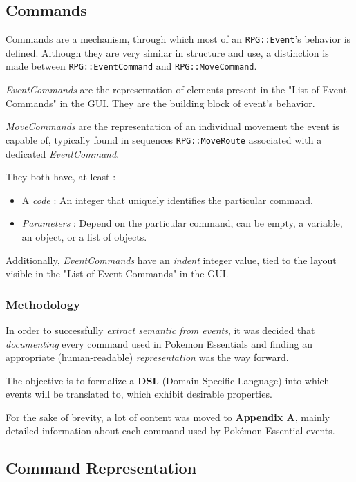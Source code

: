 \documentclass[11pt]{article}
\begin{document}
{\subsection{Commands}

Commands are a mechanism, through which most of an \verb|RPG::Event|'s behavior is defined. Although they are very similar in structure and use, a distinction is made between \verb|RPG::EventCommand| and \verb|RPG::MoveCommand|.

\textit{EventCommands} are the representation of elements present in the "List of Event Commands" in the GUI. They are the building block of event's behavior.

\textit{MoveCommands} are the representation of an individual movement the event is capable of, typically found in sequences \verb|RPG::MoveRoute| associated with a dedicated \textit{EventCommand}.

They both have, at least :
\begin{itemize}
	\item A \textit{code} : An integer that uniquely identifies the particular command.
	\item \textit{Parameters} : Depend on the particular command, can be empty, a variable, an object, or a list of objects.
\end{itemize}

Additionally, \textit{EventCommands} have an \textit{indent} integer value, tied to the layout visible in the "List of Event Commands" in the GUI.




\subsubsection{Methodology}

In order to successfully \textit{extract semantic from events}, it was decided that \textit{documenting} every command used in Pokemon Essentials and finding an appropriate (human-readable) \textit{representation} was the way forward.

The objective is to formalize a \textbf{DSL} (Domain Specific Language) into which events will be translated to, which exhibit desirable properties.


For the sake of brevity, a lot of content was moved to \textbf{Appendix A}, mainly detailed information about each command used by Pokémon Essential events.




\subsection{Command Representation}

}
\end{document}
